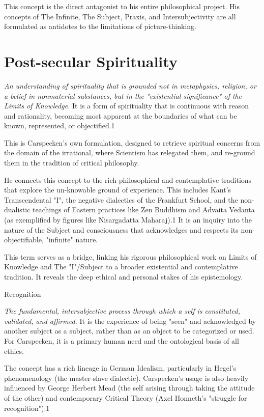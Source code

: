 \documentclass{book}
\begin{document}
This concept is the direct antagonist to his entire philosophical project. His concepts of The Infinite, The Subject, Praxis, and Intersubjectivity are all formulated as antidotes to the limitations of picture-thinking.

\parencite{Carspecken2018}



\section{Post-secular Spirituality}

\textit{An understanding of spirituality that is grounded not in metaphysics, religion, or a belief in nonmaterial substances, but in the "existential significance" of the Limits of Knowledge.} It is a form of spirituality that is continuous with reason and rationality, becoming most apparent at the boundaries of what can be known, represented, or objectified.1

This is Carspecken's own formulation, designed to retrieve spiritual concerns from the domain of the irrational, where Scientism has relegated them, and re-ground them in the tradition of critical philosophy.

He connects this concept to the rich philosophical and contemplative traditions that explore the un-knowable ground of experience. This includes Kant's Transcendental "I", the negative dialectics of the Frankfurt School, and the non-dualistic teachings of Eastern practices like Zen Buddhism and Advaita Vedanta (as exemplified by figures like Nisargadatta Maharaj).1 It is an inquiry into the nature of the Subject and consciousness that acknowledges and respects its non-objectifiable, "infinite" nature.

This term serves as a bridge, linking his rigorous philosophical work on Limits of Knowledge and The "I"/Subject to a broader existential and contemplative tradition. It reveals the deep ethical and personal stakes of his epistemology.

\parencite{Carspecken2009aa}
Recognition

\textit{The fundamental, intersubjective process through which a self is constituted, validated, and affirmed.} It is the experience of being "seen" and acknowledged by another subject as a subject, rather than as an object to be categorized or used. For Carspecken, it is a primary human need and the ontological basis of all ethics.

The concept has a rich lineage in German Idealism, particularly in Hegel's phenomenology (the master-slave dialectic). Carspecken's usage is also heavily influenced by George Herbert Mead (the self arising through taking the attitude of the other) and contemporary Critical Theory (Axel Honneth's "struggle for recognition").1
\end{document}
